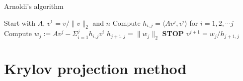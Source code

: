 \begin{algorithm} 
\begin{algorithmic} \caption{Arnoldi's algorithm\cite{arnold}} \label{alg:arnoldi}  
\STATE Start with $A$, $v^1 = v/\|v \|_2$ and $n$
   \STATE Compute $h_{i,j} = \langle Av^j,v^i \rangle $ for $i = 1,2,\cdots j$
    \STATE Compute $w_j := A v^j - \Sigma_{i=1}^{j} h_{i,j}v^i $
    \STATE $h_{j+1,j} = \| w_j \|_2$
        \STATE\textbf{STOP}
    \ENDIF 
   \STATE $v^{j+1} = w_j/h_{j+1,j}$
\ENDFOR
\end{algorithmic} 
\end{algorithm}
\section{Krylov projection method} \label{sec:fullKPM}

